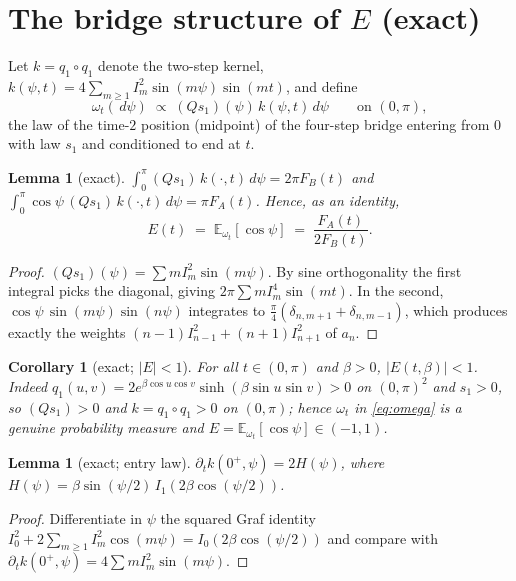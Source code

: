 \documentclass[11pt]{article}
\newtheorem{lemma}[theorem]{Lemma}
\newtheorem{corollary}[theorem]{Corollary}
\theoremstyle{remark}
\newcommand{\FA}{F_{\!A}}
\newcommand{\FB}{F_{\!B}}
\newcommand{\dd}{\,d}
\begin{document}
\section{The bridge structure of $E$ (exact)}\label{sec:bridge}

Let $k=q_1\!\circ\!q_1$ denote the two-step kernel,
$k(\psi,t)=4\sum_{m\ge1}I_m^2\sin(m\psi)\sin(mt)$, and define
\begin{equation}\label{eq:omega}
\omega_t(\dd\psi)\;\propto\;(Qs_1)(\psi)\,k(\psi,t)\dd\psi
\qquad\text{on }(0,\pi),
\end{equation}
the law of the time-$2$ position (midpoint) of the four-step bridge
entering from $0$ with law $s_1$ and conditioned to end at $t$.

\begin{lemma}[exact]\label{lem:bridge}
$\displaystyle \int_0^\pi (Qs_1)\,k(\cdot,t)\dd\psi=2\pi\FB(t)$ and
$\displaystyle \int_0^\pi \cos\psi\,(Qs_1)\,k(\cdot,t)\dd\psi=\pi\FA(t)$.
Hence, as an identity,
\[
E(t)\;=\;\mathbb{E}_{\omega_t}[\cos\psi]\;=\;\frac{\FA(t)}{2\FB(t)} .
\]
\end{lemma}

\begin{proof}
$(Qs_1)(\psi)=\sum m I_m^2\sin(m\psi)$. By sine orthogonality the first
integral picks the diagonal, giving $2\pi\sum mI_m^4\sin(mt)$. In the
second, $\cos\psi\,\sin(m\psi)\sin(n\psi)$ integrates to
$\frac{\pi}{4}(\delta_{n,m+1}+\delta_{n,m-1})$, which produces exactly
the weights $(n-1)I_{n-1}^2+(n+1)I_{n+1}^2$ of $a_n$.
\end{proof}

\begin{corollary}[exact; $|E|<1$]\label{cor:Ebound}
For all $t\in(0,\pi)$ and $\beta>0$, $|E(t,\beta)|<1$. Indeed
$q_1(u,v)=2e^{\beta\cos u\cos v}\sinh(\beta\sin u\sin v)>0$ on
$(0,\pi)^2$ and $s_1>0$, so $(Qs_1)>0$ and $k=q_1\!\circ\!q_1>0$ on
$(0,\pi)$; hence $\omega_t$ in \eqref{eq:omega} is a genuine
probability measure and
$E=\mathbb{E}_{\omega_t}[\cos\psi]\in(-1,1)$.
\end{corollary}

\begin{lemma}[exact; entry law]\label{lem:entry}
$\partial_t k(0^+,\psi)=2H(\psi)$, where
$H(\psi)=\beta\sin(\psi/2)\,I_1(2\beta\cos(\psi/2))$.
\end{lemma}

\begin{proof}
Differentiate in $\psi$ the squared Graf identity
$I_0^2+2\sum_{m\ge1}I_m^2\cos(m\psi)=I_0(2\beta\cos(\psi/2))$
\cite[\S10.23(ii)]{DLMF} and compare with
$\partial_tk(0^+,\psi)=4\sum mI_m^2\sin(m\psi)$.
\end{proof}
\end{document}
